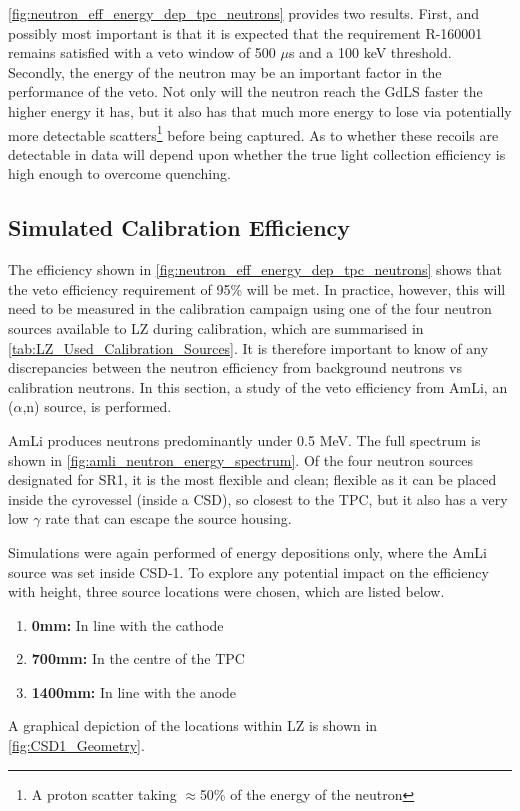 

\par
\autoref{fig:neutron_eff_energy_dep_tpc_neutrons} provides two results.
First, and possibly most important is that it is expected that the requirement R-160001 remains satisfied with a veto window of 500 $\mu$s and a 100 keV threshold.
Secondly, the energy of the neutron may be an important factor in the performance of the veto.
Not only will the neutron reach the GdLS faster the higher energy it has, but it also has that much more energy to lose via potentially more detectable scatters\footnote{A proton scatter taking $\approx$50\% of the energy of the neutron} before being captured.
As to whether these recoils are detectable in data will depend upon whether the true light collection efficiency is high enough to overcome quenching.

\subsection{Simulated Calibration Efficiency}
\par
The efficiency shown in \autoref{fig:neutron_eff_energy_dep_tpc_neutrons} shows that the veto efficiency requirement of 95\% will be met.
In practice, however, this will need to be measured in the calibration campaign using one of the four neutron sources available to LZ during calibration, which are summarised in \autoref{tab:LZ_Used_Calibration_Sources}.
It is therefore important to know of any discrepancies between the neutron efficiency from background neutrons vs calibration neutrons.
In this section, a study of the veto efficiency from AmLi, an ($\alpha$,n) source, is performed.
\par
AmLi produces neutrons predominantly under 0.5 MeV.
The full spectrum is shown in \autoref{fig:amli_neutron_energy_spectrum}.
Of the four neutron sources designated for SR1, it is the most flexible and clean; flexible as it can be placed inside the cyrovessel (inside a CSD), so closest to the TPC, but it also has a very low $\gamma$ rate that can escape the source housing.



\par
Simulations were again performed of energy depositions only, where the AmLi source was set inside CSD-1.
To explore any potential impact on the efficiency with height, three source locations were chosen, which are listed below.
\begin{enumerate}
    \item \textbf{0mm:} In line with the cathode
    \item \textbf{700mm:} In the centre of the TPC
    \item \textbf{1400mm:} In line with the anode
\end{enumerate}
A graphical depiction of the locations within LZ is shown in \autoref{fig:CSD1_Geometry}. 

